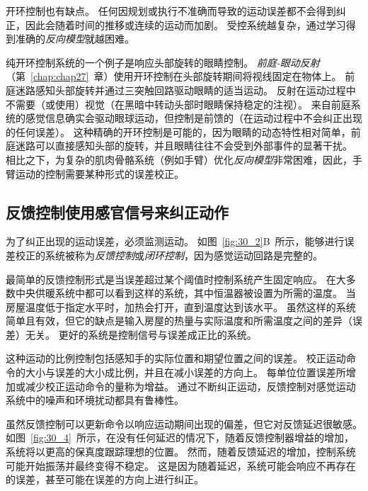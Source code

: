 开环控制也有缺点。
任何因规划或执行不准确而导致的运动误差都不会得到纠正，因此会随着时间的推移或连续的运动而加剧。
受控系统越复杂，通过学习得到准确的\textit{反向模型}就越困难。


纯开环控制系统的一个例子是响应头部旋转的眼睛控制。
\textit{前庭-眼动反射}（第~\ref{chap:chap27}~章）使用开环控制在头部旋转期间将视线固定在物体上。
前庭迷路感知头部旋转并通过三突触回路驱动眼睛的适当运动。
反射在运动过程中不需要（或使用）视觉（在黑暗中转动头部时眼睛保持稳定的注视）。
来自前庭系统的感觉信息确实会驱动眼球运动，但控制是前馈的（在运动过程中不会纠正出现的任何误差）。
这种精确的开环控制是可能的，因为眼睛的动态特性相对简单，前庭迷路可以直接感知头部的旋转，并且眼睛往往不会受到外部事件的显著干扰。
相比之下，为复杂的肌肉骨骼系统（例如手臂）优化\textit{反向模型}非常困难，因此，手臂运动的控制需要某种形式的误差校正。



\subsection{反馈控制使用感官信号来纠正动作}

为了纠正出现的运动误差，必须监测运动。
如图~\ref{fig:30_2}B~所示，能够进行误差校正的系统被称为\textit{反馈控制}或\textit{闭环控制}，因为感觉运动回路是完整的。


最简单的反馈控制形式是当误差超过某个阈值时控制系统产生固定响应。
在大多数中央供暖系统中都可以看到这样的系统，其中恒温器被设置为所需的温度。
当房屋温度低于指定水平时，加热会打开，直到温度达到该水平。
虽然这样的系统简单且有效，但它的缺点是输入房屋的热量与实际温度和所需温度之间的差异（误差）无关。
更好的系统是控制信号与误差成正比的系统。


这种运动的比例控制包括感知手的实际位置和期望位置之间的误差。
校正运动命令的大小与误差的大小成比例，并且在减小误差的方向上。
每单位位置误差所增加或减少校正运动命令的量称为增益。
通过不断纠正运动，反馈控制对感觉运动系统中的噪声和环境扰动都具有鲁棒性。


虽然反馈控制可以更新命令以响应运动期间出现的偏差，但它对反馈延迟很敏感。
如图~\ref{fig:30_4}~所示，在没有任何延迟的情况下，随着反馈控制器增益的增加，系统将以更高的保真度跟踪理想的位置。
然而，随着反馈延迟的增加，控制系统可能开始振荡并最终变得不稳定。
这是因为随着延迟，系统可能会响应不再存在的误差，甚至可能在误差的方向上进行纠正。


